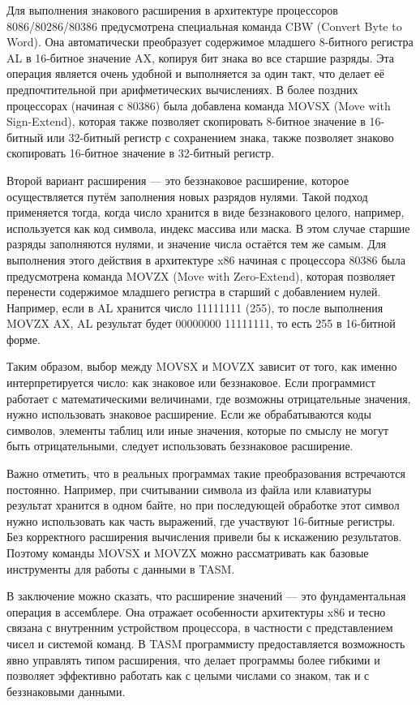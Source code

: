 Для выполнения знакового расширения в архитектуре процессоров 8086/80286/80386 предусмотрена специальная команда CBW (Convert Byte to Word). Она автоматически преобразует содержимое младшего 8-битного регистра AL в 16-битное значение AX, копируя бит знака во все старшие разряды. Эта операция является очень удобной и выполняется за один такт, что делает её предпочтительной при арифметических вычислениях. В более поздних процессорах (начиная с 80386) была добавлена команда MOVSX (Move with Sign-Extend), которая также позволяет скопировать 8-битное значение в 16-битный или 32-битный регистр с сохранением знака, также позволяет знаково скопировать 16-битное значение в 32-битный регистр.

Второй вариант расширения — это беззнаковое расширение, которое осуществляется путём заполнения новых разрядов нулями. Такой подход применяется тогда, когда число хранится в виде беззнакового целого, например, используется как код символа, индекс массива или маска. В этом случае старшие разряды заполняются нулями, и значение числа остаётся тем же самым. Для выполнения этого действия в архитектуре x86 начиная с процессора 80386 была предусмотрена команда MOVZX (Move with Zero-Extend), которая позволяет перенести содержимое младшего регистра в старший с добавлением нулей. Например, если в AL хранится число 11111111 (255), то после выполнения MOVZX AX, AL результат будет 00000000 11111111, то есть 255 в 16-битной форме.

Таким образом, выбор между MOVSX и MOVZX зависит от того, как именно интерпретируется число: как знаковое или беззнаковое. Если программист работает с математическими величинами, где возможны отрицательные значения, нужно использовать знаковое расширение. Если же обрабатываются коды символов, элементы таблиц или иные значения, которые по смыслу не могут быть отрицательными, следует использовать беззнаковое расширение.

Важно отметить, что в реальных программах такие преобразования встречаются постоянно. Например, при считывании символа из файла или клавиатуры результат хранится в одном байте, но при последующей обработке этот символ нужно использовать как часть выражений, где участвуют 16-битные регистры. Без корректного расширения вычисления привели бы к искажению результатов. Поэтому команды MOVSX и MOVZX можно рассматривать как базовые инструменты для работы с данными в TASM.

В заключение можно сказать, что расширение значений — это фундаментальная операция в ассемблере. Она отражает особенности архитектуры x86 и тесно связана с внутренним устройством процессора, в частности с представлением чисел и системой команд. В TASM программисту предоставляется возможность явно управлять типом расширения, что делает программы более гибкими и позволяет эффективно работать как с целыми числами со знаком, так и с беззнаковыми данными.

